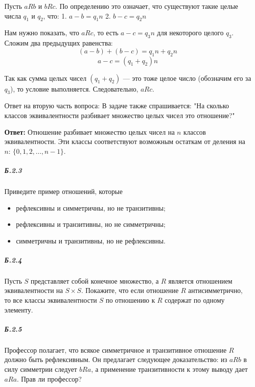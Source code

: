 Пусть $a R b$ и $b R c$. По определению это означает, что существуют такие целые числа $q_1$ и $q_2$, что:
1. $a - b = q_1 n$
2. $b - c = q_2 n$

Нам нужно показать, что $a R c$, то есть $a - c = q_3 n$ для некоторого целого $q_3$. Сложим два предыдущих равенства:
\[ (a - b) + (b - c) = q_1 n + q_2 n \]
\[ a - c = (q_1 + q_2) n \]

Так как сумма целых чисел $(q_1 + q_2)$ — это тоже целое число (обозначим его за $q_3$), то условие выполняется. Следовательно, $a R c$.

Ответ на вторую часть вопроса:
В задаче также спрашивается: "На сколько классов эквивалентности разбивает множество целых чисел это отношение?"

\textbf{Ответ:}
Отношение разбивает множество целых чисел на $n$ классов эквивалентности. 
Эти классы соответствуют возможным остаткам от деления на $n$: $\{0, 1, 2, \dots, n-1\}$.

\subparagraph{Б.2.3}
Приведите пример отношений, которые
\begin{itemize}
    \item[\textbf{а.}] рефлексивны и симметричны, но не транзитивны;
    \item[\textbf{б.}] рефлексивны и транзитивны, но не симметричны;
    \item[\textbf{в.}] симметричны и транзитивны, но не рефлексивны.
\end{itemize}

\subparagraph{Б.2.4}
Пусть $S$ представляет собой конечное множество, а $R$ является отношением эквивалентности на $S \times S$.
Покажите, что если отношение $R$ антисимметрично, то все классы эквивалентности $S$ по отношению к $R$ содержат по одному элементу.

\subparagraph{Б.2.5}
Профессор полагает, что всякое симметричное и транзитивное отношение $R$ должно быть рефлексивным.
Он предлагает следующее доказательство: из $a R b$ в силу симметрии следует $b R a$,
а применение транзитивности к этому выводу дает $a R a$. Прав ли профессор?